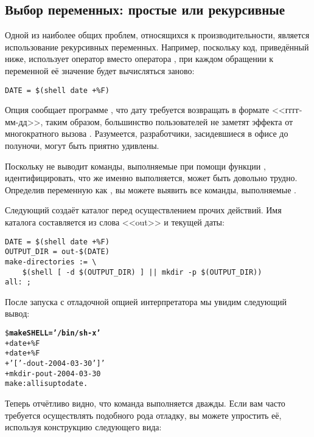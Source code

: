 \subsection{Выбор переменных: простые или рекурсивные}
Одной из наиболее общих проблем, относящихся к производительности,
является использование рекурсивных переменных. Например, поскольку
код, приведённый ниже, использует оператор \command{=} вместо
оператора \command{:=}, при каждом обращении к переменной
 её значение будет вычисляться заново:

{\footnotesize
\begin{verbatim}
DATE = $(shell date +%F)
\end{verbatim}
}

Опция  сообщает программе , что дату
требуется возвращать в формате <<гггг-мм-дд>>, таким образом,
большинство пользователей не заметят эффекта от многократного вызова
. Разумеется, разработчики, засидевшиеся в офисе до
полуночи, могут быть приятно удивлены.

Поскольку \GNUmake{} не выводит команды, выполняемые при помощи
функции , идентифицировать, что же именно выполняется,
может быть довольно трудно. Определив переменную  как
, вы можете выявить все команды, выполняемые
\GNUmake{}.

Следующий \makefile{} создаёт каталог перед осуществлением прочих
действий. Имя каталога составляется из слова <<out>> и текущей даты:

{\footnotesize
\begin{verbatim}
DATE = $(shell date +%F)
OUTPUT_DIR = out-$(DATE)
make-directories := \
    $(shell [ -d $(OUTPUT_DIR) ] || mkdir -p $(OUTPUT_DIR))
all: ;
\end{verbatim}
}

После запуска  с отладочной опцией интерпретатора мы
увидим следующий вывод:

{\footnotesize
\begin{alltt}
\$ \textbf{make SHELL='/bin/sh -x'}
+ date +\%F
+ date +\%F
+ '[' -d out-2004-03-30 ']'
+ mkdir -p out-2004-03-30
make: all is up to date.
\end{alltt}
}

Теперь отчётливо видно, что команда  выполняется дважды.
Если вам часто требуется осуществлять подобного рода отладку, вы
можете упростить её, используя конструкцию следующего вида:

